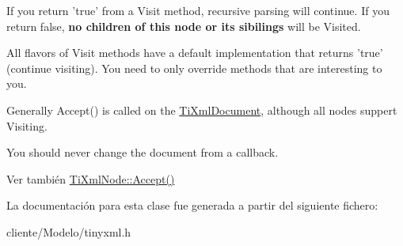 \-If you return 'true' from a \-Visit method, recursive parsing will continue. \-If you return false, {\bfseries no children of this node or its sibilings} will be \-Visited.

\-All flavors of \-Visit methods have a default implementation that returns 'true' (continue visiting). \-You need to only override methods that are interesting to you.

\-Generally \-Accept() is called on the \hyperlink{classTiXmlDocument}{\-Ti\-Xml\-Document}, although all nodes suppert \-Visiting.

\-You should never change the document from a callback.

\begin{DoxySeeAlso}{\-Ver también}
\hyperlink{classTiXmlNode_acc0f88b7462c6cb73809d410a4f5bb86}{\-Ti\-Xml\-Node\-::\-Accept()} 
\end{DoxySeeAlso}


\-La documentación para esta clase fue generada a partir del siguiente fichero\-:\begin{DoxyCompactItemize}
\item 
cliente/\-Modelo/tinyxml.\-h\end{DoxyCompactItemize}
